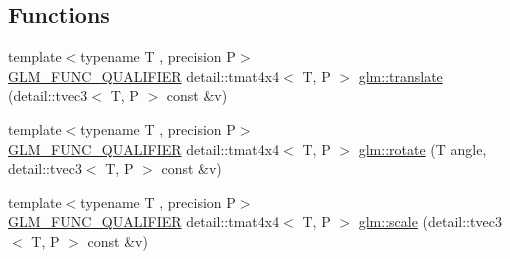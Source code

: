 \subsection*{Functions}
\begin{DoxyCompactItemize}
\item 
{\footnotesize template$<$typename T , precision P$>$ }\\\hyperlink{setup_8hpp_a33fdea6f91c5f834105f7415e2a64407}{G\+L\+M\+\_\+\+F\+U\+N\+C\+\_\+\+Q\+U\+A\+L\+I\+F\+I\+ER} detail\+::tmat4x4$<$ T, P $>$ \hyperlink{group__gtx__transform_ga8a2efce0917bf301cc0ea7afb428f688}{glm\+::translate} (detail\+::tvec3$<$ T, P $>$ const \&v)
\item 
{\footnotesize template$<$typename T , precision P$>$ }\\\hyperlink{setup_8hpp_a33fdea6f91c5f834105f7415e2a64407}{G\+L\+M\+\_\+\+F\+U\+N\+C\+\_\+\+Q\+U\+A\+L\+I\+F\+I\+ER} detail\+::tmat4x4$<$ T, P $>$ \hyperlink{group__gtx__transform_gaac4ccdbf699a62fe6429005512c0cda5}{glm\+::rotate} (T angle, detail\+::tvec3$<$ T, P $>$ const \&v)
\item 
{\footnotesize template$<$typename T , precision P$>$ }\\\hyperlink{setup_8hpp_a33fdea6f91c5f834105f7415e2a64407}{G\+L\+M\+\_\+\+F\+U\+N\+C\+\_\+\+Q\+U\+A\+L\+I\+F\+I\+ER} detail\+::tmat4x4$<$ T, P $>$ \hyperlink{group__gtx__transform_ga80eb26a1eb382b7ab1e3631532d21103}{glm\+::scale} (detail\+::tvec3$<$ T, P $>$ const \&v)
\end{DoxyCompactItemize}
